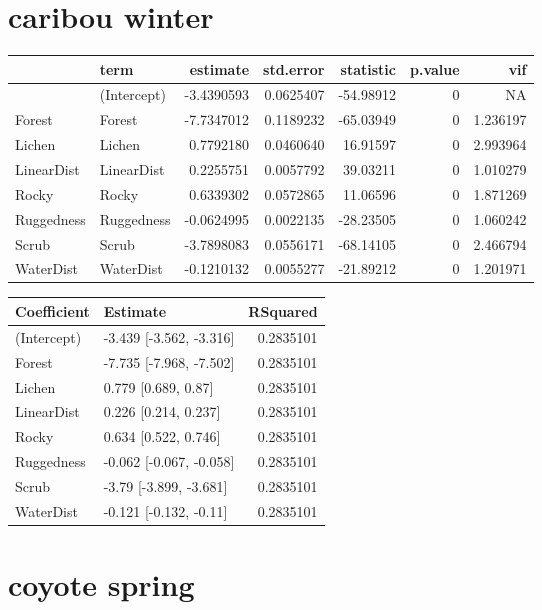 \documentclass[]{article}
\begin{document}
\section{caribou winter}\label{caribou-winter}

\begin{tabular}{llrrrrr}
\toprule
  & term & estimate & std.error & statistic & p.value & vif\\
\midrule
 & (Intercept) & -3.4390593 & 0.0625407 & -54.98912 & 0 & NA\\
Forest & Forest & -7.7347012 & 0.1189232 & -65.03949 & 0 & 1.236197\\
Lichen & Lichen & 0.7792180 & 0.0460640 & 16.91597 & 0 & 2.993964\\
LinearDist & LinearDist & 0.2255751 & 0.0057792 & 39.03211 & 0 & 1.010279\\
Rocky & Rocky & 0.6339302 & 0.0572865 & 11.06596 & 0 & 1.871269\\
Ruggedness & Ruggedness & -0.0624995 & 0.0022135 & -28.23505 & 0 & 1.060242\\
Scrub & Scrub & -3.7898083 & 0.0556171 & -68.14105 & 0 & 2.466794\\
WaterDist & WaterDist & -0.1210132 & 0.0055277 & -21.89212 & 0 & 1.201971\\
\bottomrule
\end{tabular}

\begin{tabular}{llr}
\toprule
Coefficient & Estimate & RSquared\\
\midrule
(Intercept) & -3.439 [-3.562, -3.316] & 0.2835101\\
Forest & -7.735 [-7.968, -7.502] & 0.2835101\\
Lichen & 0.779 [0.689, 0.87] & 0.2835101\\
LinearDist & 0.226 [0.214, 0.237] & 0.2835101\\
Rocky & 0.634 [0.522, 0.746] & 0.2835101\\
Ruggedness & -0.062 [-0.067, -0.058] & 0.2835101\\
Scrub & -3.79 [-3.899, -3.681] & 0.2835101\\
WaterDist & -0.121 [-0.132, -0.11] & 0.2835101\\
\bottomrule
\end{tabular}

\section{coyote spring}\label{coyote-spring}
\end{document}
